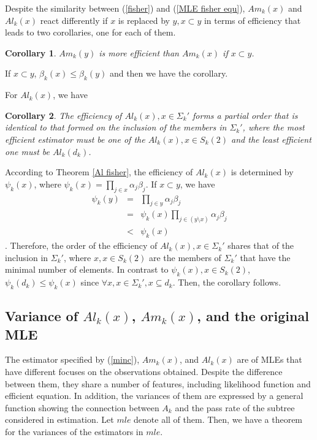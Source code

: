 \documentclass[10pt,onecolumn]{IEEEtran}
\newtheorem{corollary}{\bf Corollary}
\begin{document}
Despite the similarity between (\ref{fisher}) and (\ref{MLE fisher equ}),  $Am_k(x)$ and $Al_k(x)$ react differently if $x$ is replaced by $y, x \subset y$ in terms of efficiency that leads to two corollaries, one for each of them.
\begin{corollary}
$Am_k(y)$ is more efficient than $Am_k(x)$ if $x \subset y$.
\end{corollary}
\begin{IEEEproof}
If $x \subset y$, $\beta_k(x) \leq \beta_k(y)$ and then we have the corollary.
\end{IEEEproof}
For $Al_k(x)$, we have
\begin{corollary} 
The efficiency of $Al_k(x), x \in \Sigma_k'$ forms a partial order that is identical to that formed on the inclusion of the members in $\Sigma_k'$, where the most efficient estimator must be one of the $Al_k(x), x \in S_k(2)$ and the least efficient one must be $Al_k(d_k)$.
\label{Al corollary}
\end{corollary}
\begin{IEEEproof}
According to Theorem \ref{Al fisher}, the efficiency of $Al_k(x)$ is determined by $\psi_k(x)$, where $\psi_k(x)=\prod_{j \in x} \alpha_j \beta_j$. If $x \subset y$, we have
 \begin{eqnarray}
 \psi_k(y)&=&\prod_{j \in y} \alpha_j \beta_j \nonumber \\
 &=&\psi_k(x)\prod_{j \in (y \setminus x)} \alpha_j \beta_j \nonumber \\
 &<& \psi_k(x)
 \end{eqnarray}.
 Therefore, the order of the efficiency of $Al_k(x), x \in \Sigma_k'$ shares that of the inclusion in $\Sigma_k'$, where $x, x \in S_k(2)$ are the members of $\Sigma_k'$ that have the minimal number of elements.
 In contrast to $\psi_k(x), x \in S_k(2)$, $\psi_k(d_k)\leq \psi_k(x)$ since $\forall x, x \in \Sigma_k', x \subseteq d_k$. Then, the corollary follows.
\end{IEEEproof}

\subsection{Variance of $Al_k(x)$, $Am_k(x)$, and the original MLE}
The estimator specified by (\ref{minc}),  $Am_k(x)$, and $Al_k(x)$ are of MLEs that have different focuses on the observations obtained. Despite the difference between them, they share a number of features, including likelihood function and efficient equation. In addition, the variances of them are expressed by a general function showing the connection between $A_k$ and the pass rate of the subtree considered in estimation. Let $mle$ denote all of them. Then, we have a theorem for the variances of the estimators in $mle$.
\end{document}
